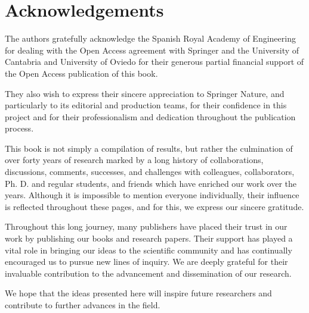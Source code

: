 \chapter*{Acknowledgements}

The authors gratefully acknowledge the Spanish Royal Academy of Engineering for dealing with the Open Access agreement with Springer and the University of Cantabria and University of Oviedo for their generous partial financial support of the Open Access publication of this book.

They also wish to express their sincere appreciation to Springer Nature, and particularly to its editorial and production teams, for their confidence in this project and for their professionalism and dedication throughout the publication process.

This book is not simply a compilation of results, but rather the culmination of over forty years of research marked by a long history of collaborations, discussions, comments, successes, and challenges with colleagues, collaborators, Ph. D. and regular students, and friends which have enriched our work over the years. Although it is impossible to mention everyone individually, their influence is reflected throughout these pages, and for this, we express our sincere gratitude.

Throughout this long journey, many publishers have placed their trust in our work by publishing our books and research papers. Their support has played a vital role in bringing our ideas to the scientific community and has continually encouraged us to pursue new lines of inquiry. We are deeply grateful for their invaluable contribution to the advancement and dissemination of our research.

We hope that the ideas presented here will inspire future researchers and contribute to further advances in the field.
